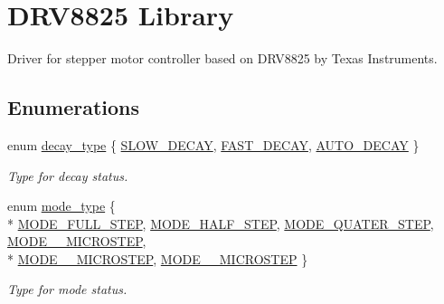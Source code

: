 \hypertarget{group__biba__drv}{\section{D\-R\-V8825 Library}
\label{group__biba__drv}
}


Driver for stepper motor controller based on D\-R\-V8825 by Texas Instruments.  


\subsection*{Enumerations}
\begin{DoxyCompactItemize}
\item 
enum \hyperlink{group__biba__drv_gafe05744bd777532cf059c0d7293a7ab8}{decay\-\_\-type} \{ \hyperlink{group__biba__drv_ggafe05744bd777532cf059c0d7293a7ab8a05f6a902065ce2f3355101cf657f4ba4}{S\-L\-O\-W\-\_\-\-D\-E\-C\-A\-Y}, 
\hyperlink{group__biba__drv_ggafe05744bd777532cf059c0d7293a7ab8af9716e06b54f75cbd7dedc154a7d49e2}{F\-A\-S\-T\-\_\-\-D\-E\-C\-A\-Y}, 
\hyperlink{group__biba__drv_ggafe05744bd777532cf059c0d7293a7ab8abbe5a117b6da07d1a52741cfff2e927a}{A\-U\-T\-O\-\_\-\-D\-E\-C\-A\-Y}
 \}
\begin{DoxyCompactList}\small\item\em Type for decay status. \end{DoxyCompactList}\item 
enum \hyperlink{group__biba__drv_ga19269c193c0c4866cdc4e5abd433f9fc}{mode\-\_\-type} \{ \\*
\hyperlink{group__biba__drv_gga19269c193c0c4866cdc4e5abd433f9fcaed3032a935a3b2a2ab90e2500dee1177}{M\-O\-D\-E\-\_\-\-F\-U\-L\-L\-\_\-\-S\-T\-E\-P}, 
\hyperlink{group__biba__drv_gga19269c193c0c4866cdc4e5abd433f9fca7bf7cb276c55a5c4e13149d1e18b320f}{M\-O\-D\-E\-\_\-\-H\-A\-L\-F\-\_\-\-S\-T\-E\-P}, 
\hyperlink{group__biba__drv_gga19269c193c0c4866cdc4e5abd433f9fcaf16653dd137a6079ff5399de04861835}{M\-O\-D\-E\-\_\-\-Q\-U\-A\-T\-E\-R\-\_\-\-S\-T\-E\-P}, 
\hyperlink{group__biba__drv_gga19269c193c0c4866cdc4e5abd433f9fca4db57f4a88897e48818d92a223cd72d7}{M\-O\-D\-E\-\_\-\_\-\-M\-I\-C\-R\-O\-S\-T\-E\-P}, 
\\*
\hyperlink{group__biba__drv_gga19269c193c0c4866cdc4e5abd433f9fcac75bcca2721976d5185711ca481ccbb0}{M\-O\-D\-E\-\_\-\_\-\-M\-I\-C\-R\-O\-S\-T\-E\-P}, 
\hyperlink{group__biba__drv_gga19269c193c0c4866cdc4e5abd433f9fcacb3d9ffb67d18343290fe5474bc1b4d5}{M\-O\-D\-E\-\_\-\_\-\-M\-I\-C\-R\-O\-S\-T\-E\-P}
 \}
\begin{DoxyCompactList}\small\item\em Type for mode status. \end{DoxyCompactList}\item 

\end{DoxyCompactItemize}
